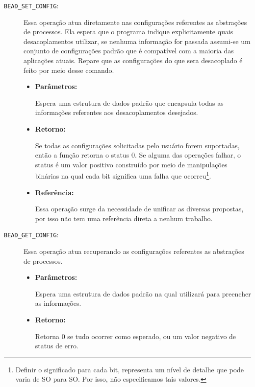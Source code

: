 \begin{description}
  \item [\texttt{BEAD\_SET\_CONFIG}:]

Essa operação atua diretamente nas configurações referentes as abstrações de
processos. Ela espera que o programa indique explicitamente quais
desacoplamentos utilizar, se nenhuma informação for passada assumi-se um
conjunto de configurações padrão que é compatível com a maioria das aplicações
atuais. Repare que as configurações do que sera desacoplado é feito por meio
desse comando.

  \begin{itemize}
    \item \textbf{Parâmetros:}

Espera uma estrutura de dados padrão que encapsula todas as informações
referentes aos desacoplamentos desejados.

    \item \textbf{Retorno:}

Se todas as configurações solicitadas pelo usuário forem suportadas, então a
função retorna o status 0. Se alguma das operações falhar, o status é um valor
positivo construído por meio de manipulações binárias na qual cada bit
significa uma falha que ocorreu\footnote{Definir o significado para cada bit,
representa um nível de detalhe que pode varia de SO para SO. Por isso, não
especificamos tais valores.}. 

    \item \textbf{Referência:}

Essa operação surge da necessidade de unificar as diversas propostas, por isso
não tem uma referência direta a nenhum trabalho.

	\end{itemize}

  \item [\texttt{BEAD\_GET\_CONFIG}:]

Essa operação atua recuperando as configurações referentes as abstrações de
processos. 

  \begin{itemize}
    \item \textbf{Parâmetros:}

Espera uma estrutura de dados padrão na qual utilizará para preencher as
informações.

    \item \textbf{Retorno:}

Retorna 0 se tudo ocorrer como esperado, ou um valor negativo de status de
erro.


\end{itemize}
\end{description}

